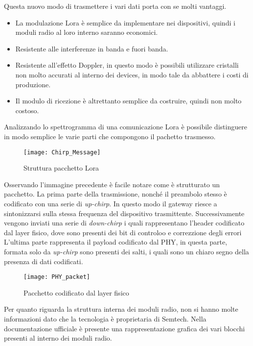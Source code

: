 Questa nuovo modo di trasmettere i vari dati porta con se molti vantaggi.
\begin{itemize}
\item La modulazione Lora è semplice da implementare nei dispositivi, quindi i
moduli radio al loro interno saranno economici.
\item Resistente alle interferenze in banda e fuori banda.
\item Resistente  all'effetto Doppler, in questo modo è possibili utilizzare
cristalli non molto accurati al interno dei devices, in modo tale da abbattere i
costi di produzione.
\item Il modulo di ricezione è altrettanto semplice da costruire, quindi non
molto costoso.
\end{itemize}

Analizzando lo spettrogramma di una comunicazione Lora è possibile distinguere
in modo semplice le varie parti che compongono il pachetto trasmesso. 

\begin{figure}[h]
\centering 
\texttt{[image: Chirp\_Message]}
\caption{Struttura pacchetto Lora }
\end{figure}

Osservando l'immagine precedente è facile notare come è strutturato un pacchetto.
La prima parte della trasmissione, nonché il preambolo  stesso è codificato con una
serie di \emph{up-chirp}. In questo modo il gateway riesce a sintonizzarsi sulla
stessa frequenza del dispositivo trasmittente.
Successivamente vengono inviati una serie di
\emph{down-chirp} i quali rappresentano l'header codificato dal layer fisico,
dove sono presenti dei bit di controloo e correzzione degli errori
L'ultima parte rappresenta il payload codificato dal PHY, in questa parte,
formata solo da \emph{up-chirp} sono presenti dei salti, i quali sono un chiaro
segno della presenza di dati codificati.

\begin{figure}[h]
\centering 
\texttt{[image: PHY\_packet]}
\caption{Pacchetto codificato dal layer fisico}
\end{figure}


Per quanto riguarda la struttura interna dei moduli radio, non si hanno molte
informazioni dato che la tecnologia è proprietaria di Semtech. Nella
documentazione ufficiale è presente una rappresentazione grafica dei vari
blocchi presenti al interno dei moduli radio.

